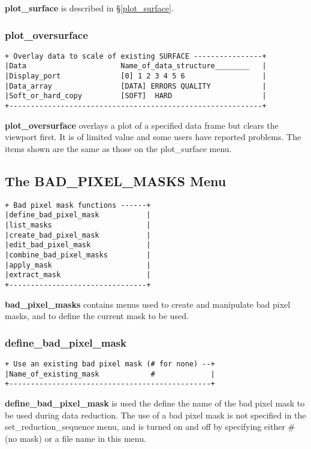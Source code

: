 {{\bf plot\_surface} is described in \S \ref{plot_surface}.

\subsubsection{plot\_oversurface}
\begin{verbatim}
+ Overlay data to scale of existing SURFACE ----------------+
|Data                      Name_of_data_structure________   |
|Display_port              [0] 1 2 3 4 5 6                  |
|Data_array                [DATA] ERRORS QUALITY            |
|Soft_or_hard_copy         [SOFT]  HARD                     |
+-----------------------------------------------------------+
\end{verbatim}

{\bf plot\_oversurface} overlays a plot of a specified data frame but
clears the viewport first. It is of limited value and some users have
reported problems. The items shown are the same as those on the 
{\sf plot\_surface} menu.

\subsection{The BAD\_PIXEL\_MASKS Menu}
\label{the_bad_pixel_masks_menu}
\begin{verbatim}
+ Bad pixel mask functions ------+
|define_bad_pixel_mask           |
|list_masks                      |
|create_bad_pixel_mask           |
|edit_bad_pixel_mask             |
|combine_bad_pixel_masks         |
|apply_mask                      |
|extract_mask                    |
+--------------------------------+
\end{verbatim}

{\bf bad\_pixel\_masks} contains menus used to create and manipulate
bad pixel masks, and to define the current mask to be used. 

\subsubsection{define\_bad\_pixel\_mask}
\begin{verbatim}
+ Use an existing bad pixel mask (# for none) --+
|Name_of_existing_mask            #             |
+-----------------------------------------------+
\end{verbatim}

{\bf define\_bad\_pixel\_mask} is used the define the name of the bad 
pixel mask to be used during data reduction. The use of a bad pixel mask 
is not specified in the {\sf set\_reduction\_sequence} menu, and is 
turned on and off by specifying either {\sf \#} (no mask) or a file name 
in this menu.

}

